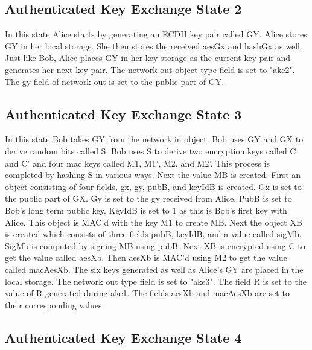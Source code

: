 \subsection{Authenticated Key Exchange State 2}


In this state Alice starts by generating an ECDH key pair called GY. Alice stores GY in her local storage. She then stores the received aesGx and hashGx as well. Just like Bob, Alice places GY in her key storage as the current key pair and generates her next key pair. The network out object type field is set to "ake2". The gy field of network out is set to the public part of GY.


\subsection{Authenticated Key Exchange State 3}


In this state Bob takes GY from the network in object. Bob uses GY and GX to derive random bits called S. Bob uses S to derive two encryption keys called C and C' and four mac keys called M1, M1', M2. and M2'. This process is completed by hashing S in various ways. Next the value MB is created. First an object consisting of four fields, gx, gy, pubB, and keyIdB is created. Gx is set to the public part of GX. Gy is set to the gy received from Alice. PubB is set to Bob's long term public key. KeyIdB is set to 1 as this is Bob's first key with Alice. This object is MAC'd with the key M1 to create MB. Next the object XB is created which consists of three fields pubB, keyIdB, and a value called sigMb. SigMb is computed by signing MB using pubB. Next XB is encrypted using C to get the value called aesXb. Then aesXb is MAC'd using M2 to get the value called macAesXb. The six keys generated as well as Alice's GY are placed in the local storage. The network out type field is set to "ake3". The field R is set to the value of R generated during ake1. The fields aesXb and macAesXb are set to their corresponding values.


\subsection{Authenticated Key Exchange State 4}


